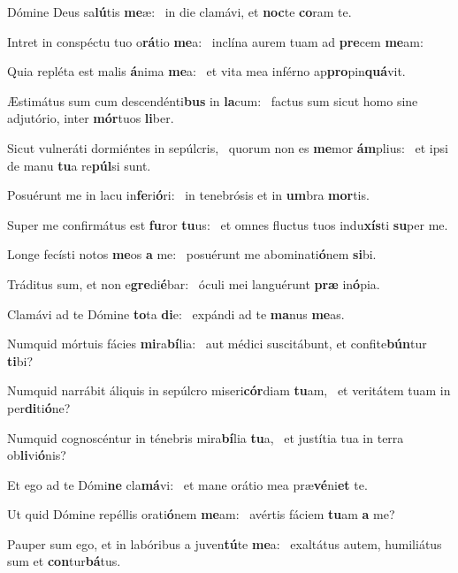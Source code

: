 \item Dómine Deus sa\textbf{lú}tis \textbf{me}æ:~\psstar{} in die clamávi, et \textbf{noc}te \textbf{co}ram te.
\item Intret in conspéctu tuo o\textbf{rá}tio \textbf{me}a:~\psstar{} inclína aurem tuam ad \textbf{pre}cem \textbf{me}am:
\item Quia repléta est malis \textbf{á}nima \textbf{me}a:~\psstar{} et vita mea inférno ap\textbf{pro}pin\textbf{quá}vit.
\item Æstimátus sum cum descendénti\textbf{bus} in \textbf{la}cum:~\psstar{} factus sum sicut homo sine adjutório, inter \textbf{mór}tuos \textbf{li}ber.
\item Sicut vulneráti dormiéntes in sepúlcris,~\pscross{} quorum non es \textbf{me}mor \textbf{ám}plius:~\psstar{} et ipsi de manu \textbf{tu}a re\textbf{púl}si sunt.
\item Posuérunt me in lacu in\textbf{fe}ri\textbf{ó}ri:~\psstar{} in tenebrósis et in \textbf{um}bra \textbf{mor}tis.
\item Super me confirmátus est \textbf{fu}ror \textbf{tu}us:~\psstar{} et omnes fluctus tuos indu\textbf{xís}ti \textbf{su}per me.
\item Longe fecísti notos \textbf{me}os \textbf{a} me:~\psstar{} posuérunt me abominati\textbf{ó}nem \textbf{si}bi.
\item Tráditus sum, et non e\textbf{gre}di\textbf{é}bar:~\psstar{} óculi mei languérunt \textbf{præ} in\textbf{ó}pia.
\item Clamávi ad te Dómine \textbf{to}ta \textbf{di}e:~\psstar{} expándi ad te \textbf{ma}nus \textbf{me}as.
\item Numquid mórtuis fácies \textbf{mi}ra\textbf{bí}lia:~\psstar{} aut médici suscitábunt, et confite\textbf{bún}tur \textbf{ti}bi?
\item Numquid narrábit áliquis in sepúlcro miseri\textbf{cór}diam \textbf{tu}am,~\psstar{} et veritátem tuam in per\textbf{di}ti\textbf{ó}ne?
\item Numquid cognoscéntur in ténebris mira\textbf{bí}lia \textbf{tu}a,~\psstar{} et justítia tua in terra ob\textbf{li}vi\textbf{ó}nis?
\item Et ego ad te Dómi\textbf{ne} cla\textbf{má}vi:~\psstar{} et mane orátio mea præ\textbf{vé}ni\textbf{et} te.
\item Ut quid Dómine repéllis orati\textbf{ó}nem \textbf{me}am:~\psstar{} avértis fáciem \textbf{tu}am \textbf{a} me?
\item Pauper sum ego, et in labóribus a juven\textbf{tú}te \textbf{me}a:~\psstar{} exaltátus autem, humiliátus sum et \textbf{con}tur\textbf{bá}tus.
